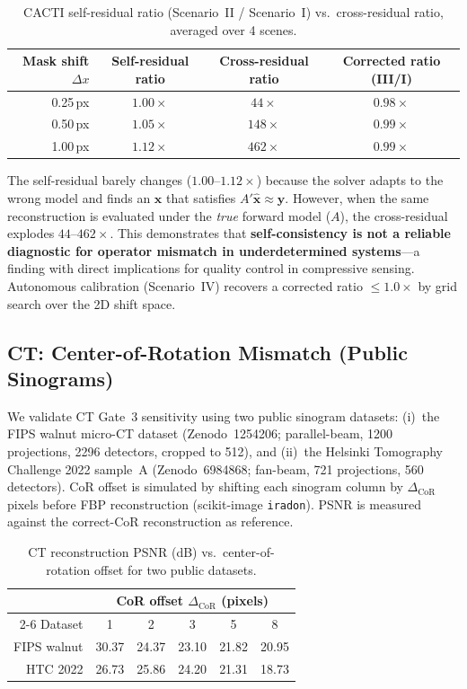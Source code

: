 \documentclass[11pt]{article}
\begin{document}
\begin{table}[!ht]
\centering\small
\caption{CACTI self-residual ratio (Scenario~II / Scenario~I) vs.\ cross-residual ratio, averaged over 4 scenes.}
\label{tab:cacti_cross_res}
\begin{tabular}{@{}rccc@{}}
\toprule
Mask shift $\Delta x$ & Self-residual ratio & Cross-residual ratio & Corrected ratio (III/I) \\
\midrule
0.25\,px & $1.00\times$ & $44\times$  & $0.98\times$ \\
0.50\,px & $1.05\times$ & $148\times$ & $0.99\times$ \\
1.00\,px & $1.12\times$ & $462\times$ & $0.99\times$ \\
\bottomrule
\end{tabular}
\end{table}

\noindent The self-residual barely changes ($1.00$--$1.12\times$) because the solver adapts to the wrong model and finds an $\mathbf{x}$ that satisfies $A'\hat{\mathbf{x}} \approx \mathbf{y}$.
However, when the same reconstruction is evaluated under the \emph{true} forward model ($A$), the cross-residual explodes $44$--$462\times$.
This demonstrates that \textbf{self-consistency is not a reliable diagnostic for operator mismatch in underdetermined systems}---a finding with direct implications for quality control in compressive sensing.
Autonomous calibration (Scenario~IV) recovers a corrected ratio $\leq 1.0\times$ by grid search over the 2D shift space.

\subsection{CT: Center-of-Rotation Mismatch (Public Sinograms)}
\label{sec:ct_cor}

We validate CT Gate~3 sensitivity using two public sinogram datasets:
(i)~the FIPS walnut micro-CT dataset (Zenodo~1254206; parallel-beam, 1200 projections, 2296 detectors, cropped to 512), and
(ii)~the Helsinki Tomography Challenge 2022 sample~A (Zenodo~6984868; fan-beam, 721 projections, 560 detectors).
CoR offset is simulated by shifting each sinogram column by $\Delta_{\mathrm{CoR}}$ pixels before FBP reconstruction (scikit-image \texttt{iradon}).
PSNR is measured against the correct-CoR reconstruction as reference.

\begin{table}[!ht]
\centering\small
\caption{CT reconstruction PSNR (dB) vs.\ center-of-rotation offset for two public datasets.}
\label{tab:ct_cor}
\begin{tabular}{@{}rccccc@{}}
\toprule
& \multicolumn{5}{c}{CoR offset $\Delta_{\mathrm{CoR}}$ (pixels)} \\
\cmidrule(l){2-6}
Dataset & 1 & 2 & 3 & 5 & 8 \\
\midrule
FIPS walnut    & 30.37 & 24.37 & 23.10 & 21.82 & 20.95 \\
HTC 2022       & 26.73 & 25.86 & 24.20 & 21.31 & 18.73 \\
\bottomrule
\end{tabular}
\end{table}
\end{document}
